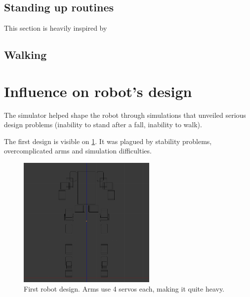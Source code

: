 \subsection{Standing up routines}
This section is heavily inspired by \cite{Stuckler06}

\subsection{Walking}

\section{Influence on robot's design}
The simulator helped shape the robot through simulations that unveiled serious design problems (inability to stand after a fall, inability to walk).

The first design is visible on \cref{fig:first_robot}. It was plagued by stability problems, overcomplicated arms and simulation difficulties. 
\begin{figure}[htp]
\center
\includegraphics[width=0.6\textwidth]{figures/robot1}
\caption[Initial robot design]{First robot design. Arms use 4 servos each, making it quite heavy.}
\label{fig:first_robot}
\end{figure}

